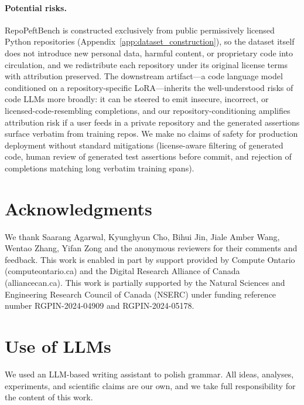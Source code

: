 \documentclass[11pt]{article}
\newcommand{\repopeftbench}{RepoPeftBench\xspace}
\begin{document}
\paragraph{Potential risks.}
\repopeftbench{} is constructed exclusively from public permissively licensed Python repositories (Appendix~\ref{app:dataset_construction}), so the dataset itself does not introduce new personal data, harmful content, or proprietary code into circulation, and we redistribute each repository under its original license terms with attribution preserved.
The downstream artifact---a code language model conditioned on a repository-specific LoRA---inherits the well-understood risks of code LLMs more broadly: it can be steered to emit insecure, incorrect, or licensed-code-resembling completions, and our repository-conditioning amplifies attribution risk if a user feeds in a private repository and the generated assertions surface verbatim from training repos.
We make no claims of safety for production deployment without standard mitigations (license-aware filtering of generated code, human review of generated test assertions before commit, and rejection of completions matching long verbatim training spans).





\section*{Acknowledgments}
We thank Saarang Agarwal, Kyunghyun Cho, Bihui Jin, Jiale Amber Wang, Wentao Zhang, Yifan Zong
and the anonymous reviewers for their comments and feedback.
This work is enabled in part by support provided by Compute Ontario (computeontario.ca) and the Digital Research Alliance of Canada (alliancecan.ca).
This work is partially supported by the Natural Sciences and Engineering Research Council of Canada (NSERC) under funding reference number RGPIN-2024-04909 and RGPIN-2024-05178.



\newpage
\clearpage
\appendix

\section{Use of LLMs}
\label{app:llms}
We used an LLM-based writing assistant to polish grammar. All ideas, analyses, experiments, and scientific claims are our own, and we take full responsibility for the content of this work.
\end{document}
